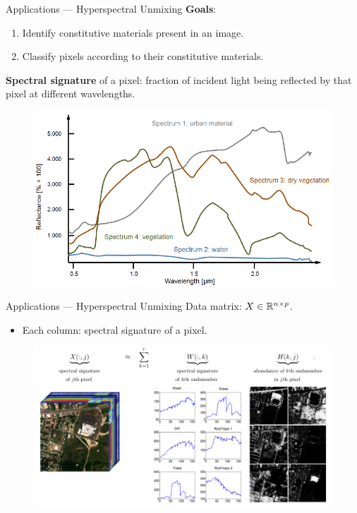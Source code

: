 \begin{frame}{Applications --- Hyperspectral Unmixing}
    \textbf{Goals}:
    \begin{enumerate}
        \item Identify constitutive materials present in an image.
        \item Classify pixels according to their constitutive materials.
    \end{enumerate}
    \vspace{1cm}
    \textbf{Spectral signature} of a pixel: fraction of incident light being reflected by that pixel at different wavelengths.\\
    \begin{figure}
        \centering
        \includegraphics[width=0.55\linewidth]{../images/Spectral-signatures.png}
    \end{figure}
\end{frame}

\begin{frame}{Applications --- Hyperspectral Unmixing}
    Data matrix: $X\in\mathbb{R}^{n\times p}$.\\
    \begin{itemize}
        \item Each column: spectral signature of a pixel.
    \end{itemize}
    \begin{figure}
        \centering
        \includegraphics[width=0.85\linewidth]{../images/NMF_app3.png}
    \end{figure}
\end{frame}
